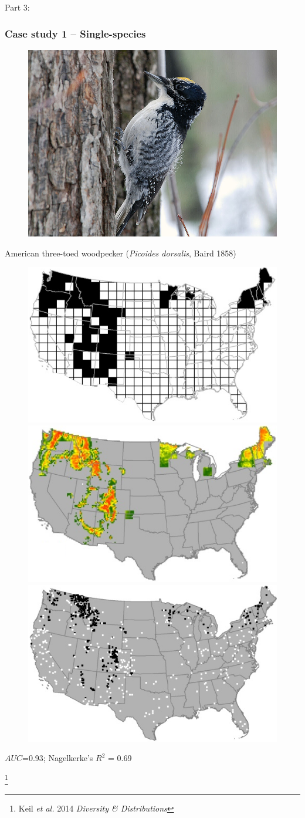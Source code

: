 \documentclass[xcolor=x11names, compress]{beamer}
\renewcommand{\(}{\begin{columns}}
\renewcommand{\)}{\end{columns}}
\newcommand{\<}[1]{\begin{column}{#1}}
\renewcommand{\>}{\end{column}}
\begin{document}
\subsection{}
\begin{frame}
	\Large{Part 3: \insertsection}
\end{frame}
\begin{frame}
\frametitle{Case study 1 -- Single-species}
\begin{figure}
	\includegraphics[width=0.25\linewidth]{fig/woodpecker.png}
\end{figure}
\centerline{American three-toed woodpecker (\textit{Picoides dorsalis}, Baird 1858)}

\begin{figure}
	\includegraphics[width=0.35\linewidth]{fig/presabs.png}
	\includegraphics[width=0.35\linewidth]{fig/model1.png}
	\includegraphics[width=0.35\linewidth]{fig/validation.png}
\end{figure}
\centerline{$AUC$=0.93; Nagelkerke's $R^2$ = 0.69}

\let\thefootnote\relax\footnote{Keil \textit{et al.} 2014 \textit{Diversity \& Distributions}}
\end{frame}
\end{document}

